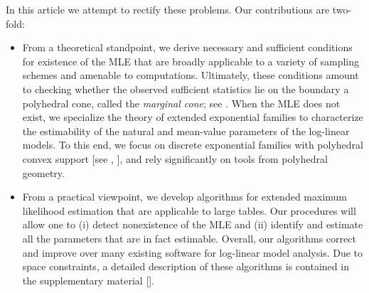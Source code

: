 \documentclass[aos,MSNbibl,nameyear,dvips]{arximspdf}
\begin{document}
In this article we attempt to rectify these problems. %
Our contributions are two-fold:
%
\begin{itemize}
%
\item From a theoretical standpoint, we derive necessary and sufficient
conditions for existence of the MLE that are broadly applicable to a
variety of sampling schemes and amenable to computations. Ultimately,
these conditions amount to checking whether the observed sufficient
statistics lie on the boundary a polyhedral cone, called the {\it
marginal cone}; see \citet{MLE06}. When the MLE does not exist, we
specialize the theory of extended exponential families to characterize
the estimability of the natural and mean-value parameters of the
log-linear models. To this end, we focus on discrete exponential
families with polyhedral convex support [see \citet{ERGM09},
\citet{GEYER09}], and rely significantly on tools from polyhedral
geometry.
\item From a practical viewpoint, we develop algorithms for extended
maximum likelihood estimation that are applicable to large tables. Our
procedures will allow one to (i) detect nonexistence of the MLE and
(ii) identify and estimate all the parameters that are in fact
estimable. Overall, our algorithms correct and improve over many
existing software for log-linear model analysis. Due to space
constraints, a detailed description of these algorithms is contained in
the supplementary material [\citet{FRsupp}].
\end{itemize}
\end{document}
